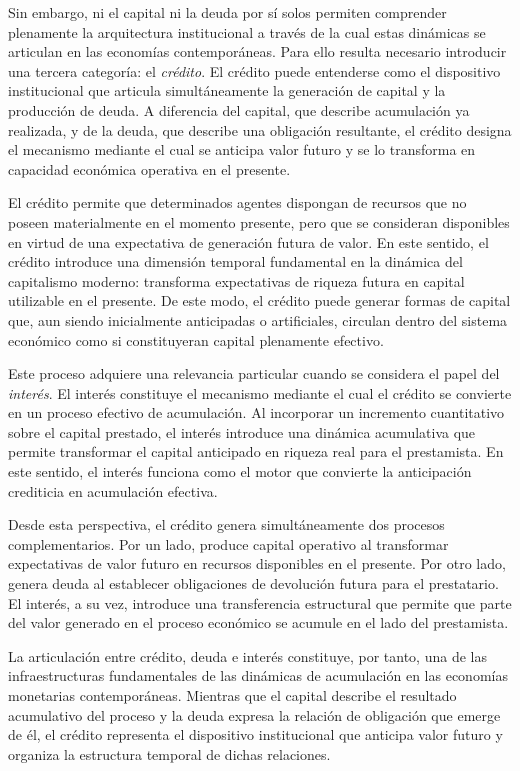 \documentclass[12pt]{article}
\begin{document}
Sin embargo, ni el capital ni la deuda por sí solos permiten comprender plenamente la arquitectura institucional a través de la cual estas dinámicas se articulan en las economías contemporáneas. Para ello resulta necesario introducir una tercera categoría: el \textit{crédito}. El crédito puede entenderse como el dispositivo institucional que articula simultáneamente la generación de capital y la producción de deuda. A diferencia del capital, que describe acumulación ya realizada, y de la deuda, que describe una obligación resultante, el crédito designa el mecanismo mediante el cual se anticipa valor futuro y se lo transforma en capacidad económica operativa en el presente.

El crédito permite que determinados agentes dispongan de recursos que no poseen materialmente en el momento presente, pero que se consideran disponibles en virtud de una expectativa de generación futura de valor. En este sentido, el crédito introduce una dimensión temporal fundamental en la dinámica del capitalismo moderno: transforma expectativas de riqueza futura en capital utilizable en el presente. De este modo, el crédito puede generar formas de capital que, aun siendo inicialmente anticipadas o artificiales, circulan dentro del sistema económico como si constituyeran capital plenamente efectivo.

Este proceso adquiere una relevancia particular cuando se considera el papel del \textit{interés}. El interés constituye el mecanismo mediante el cual el crédito se convierte en un proceso efectivo de acumulación. Al incorporar un incremento cuantitativo sobre el capital prestado, el interés introduce una dinámica acumulativa que permite transformar el capital anticipado en riqueza real para el prestamista. En este sentido, el interés funciona como el motor que convierte la anticipación crediticia en acumulación efectiva.

Desde esta perspectiva, el crédito genera simultáneamente dos procesos complementarios. Por un lado, produce capital operativo al transformar expectativas de valor futuro en recursos disponibles en el presente. Por otro lado, genera deuda al establecer obligaciones de devolución futura para el prestatario. El interés, a su vez, introduce una transferencia estructural que permite que parte del valor generado en el proceso económico se acumule en el lado del prestamista.

La articulación entre crédito, deuda e interés constituye, por tanto, una de las infraestructuras fundamentales de las dinámicas de acumulación en las economías monetarias contemporáneas. Mientras que el capital describe el resultado acumulativo del proceso y la deuda expresa la relación de obligación que emerge de él, el crédito representa el dispositivo institucional que anticipa valor futuro y organiza la estructura temporal de dichas relaciones.
\end{document}
